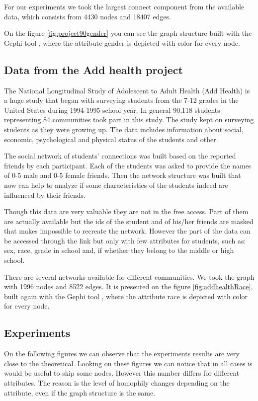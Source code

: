 \documentclass[12pt]{report}
\begin{document}
For our experiments we took the largest connect component from the available data, which consists from 4430 nodes and 18407 edges.

On the figure \ref{fig:project90gender} you can see the graph structure built with the Gephi tool \cite{GEPHI}, where the attribute gender is depicted with color for every node.


\subsection{Data from the Add health project}

The National Longitudinal Study of Adolescent to Adult Health (Add Health) is a huge study that began with surveying students from the 7-12 grades in the United States during 1994-1995 school year. In general 90,118 students representing 84 communities took part in this study. The study kept on surveying students as they were growing up. The data includes information about social, economic, psychological and physical status of the students and other. 

The social network of students' connections was built based on the reported friends by each participant. Each of the students was asked to provide the names of 0-5 male and 0-5 female friends. Then the network structure was built that now can help to analyze if some characteristics of the students indeed are influenced by their friends.

Though this data are very valuable they are not in the free access. Part of them are actually available but the ids of the student and of his/her friends are masked that makes impossible to recreate the network. However the part of the data can be accessed through the link \cite{Addhealth2} but only with few attributes for students, such as:  sex, race, grade in school and, if whether they belong to the middle or high school. 

There are several networks available for different communities. 
We took the graph with 1996 nodes and 8522 edges. It is presented on the figure \ref{fig:addhealthRace}, built again with the Gephi tool \cite{GEPHI}, where the attribute race is depicted with color for every node.


\subsection{Experiments}

On the following figures we can observe that the experiments results are very close to the theoretical. Looking on these figures we can notice that in all cases is would be useful to skip some nodes. However this number differs for different attributes. The reason is the level of homophily changes depending on the attribute, even if the graph structure is the same. 
\end{document}

